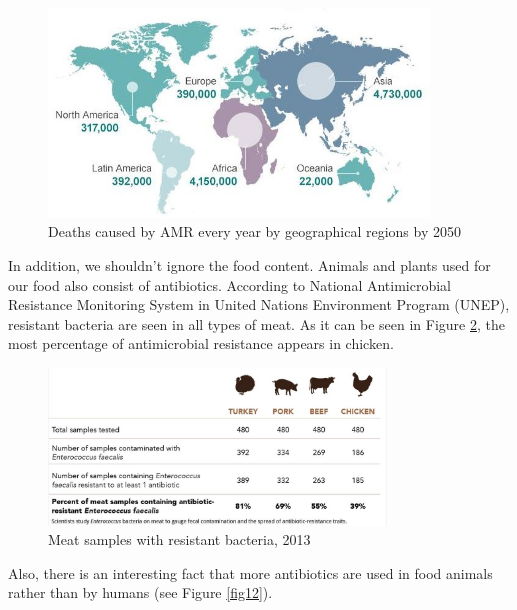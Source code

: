 \begin{figure}[H]
  \centering
  \includegraphics[width=0.9\textwidth]{img/Fig10}
  \caption{Deaths caused by AMR every year by geographical regions by 2050}
  \label{fig10}
\end{figure}

In addition, we shouldn’t ignore the food content. Animals and plants used for our food also consist of antibiotics. According to National Antimicrobial Resistance Monitoring System in United Nations Environment Program (UNEP), resistant bacteria are seen in all types of meat. As it can be seen in Figure \ref{fig11}, the most percentage of antimicrobial resistance appears in chicken.

\begin{figure}[H]
  \centering
  \includegraphics[width=0.8\textwidth]{img/Fig11}
  \caption{Meat samples with resistant bacteria, 2013}
  \label{fig11}
\end{figure}

Also, there is an interesting fact that more antibiotics are used in food animals rather than by humans (see Figure \ref{fig12}).

